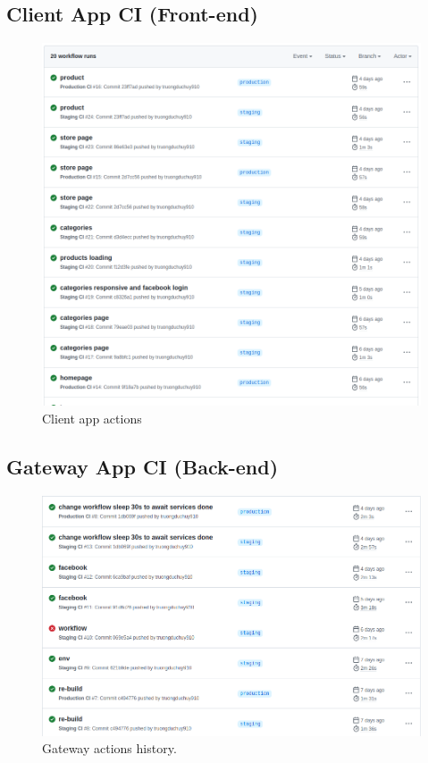 \documentclass{report}
\begin{document}
\subsection{Client App CI (Front-end)}
\begin{figure}
	\centering
	\includegraphics[width=1\linewidth]{./images/ocope-actions}
	\caption[Client app actions]{Client app actions}
	\label{fig:ocope-actions}
\end{figure}


\subsection{Gateway App CI (Back-end)}

\begin{figure}
	\centering
	\includegraphics[width=1\linewidth]{./images/gateway-actions}
	\caption[Gateway actions]{Gateway actions history.}
	\label{fig:gateway-actions}
\end{figure}
\end{document}
